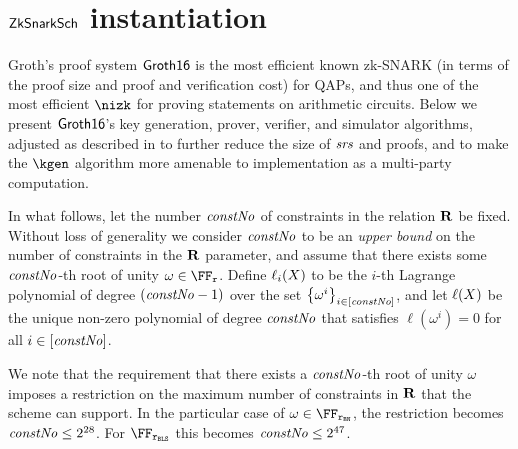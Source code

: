 
\section{$\mathsf{ZkSnarkSch}$ instantiation}\label{instantiation:zksnark}

Groth's proof system $\mathsf{Groth16}$ \cite{groth2016size} is the most efficient known zk-SNARK (in terms of the proof size and proof and verification cost) for QAPs, and thus one of the most efficient $\nizk$ for proving statements on arithmetic circuits. Below we present $\mathsf{Groth16}$'s key generation, prover, verifier, and simulator algorithms, adjusted as described in \cite{bowe2017mpc} to further reduce the size of $\mathit{srs}$ and proofs, and to make the $\kgen$ algorithm more amenable to implementation as a multi-party computation.

In what follows, let the number $\mathit{constNo}$ of constraints in the relation $\mathbf{R}$ be fixed. Without loss of generality we consider $\mathit{constNo}$ to be an \emph{upper bound} on the number of constraints in the $\mathbf{R}$ parameter, and assume that there exists some $\mathit{constNo}$-th root of unity $\omega \in \FFx{\rCURVE}$. Define $\ell_i(X)$ to be the $i$-th Lagrange polynomial of degree $(\mathit{constNo} - 1)$ over the set $\left\{{\omega^i}\right\}_{i \in [\mathit{constNo}]}$, and let $\ell(X)$ be the unique non-zero polynomial of degree $\mathit{constNo}$ that satisfies $\ell(\omega^i) = 0$ for all $i \in [\mathit{constNo}]$.

We note that the requirement that there exists a $\mathit{constNo}$-th root of unity $\omega$ imposes a restriction on the maximum number of constraints in $\mathbf{R}$ that the scheme can support. In the particular case of $\omega \in \FFx{\rBN}$, the restriction becomes $\mathit{constNo} \leq 2^{28}$. For $\FFx{\rBLS}$ this becomes $\mathit{constNo} \leq 2^{47}$.


